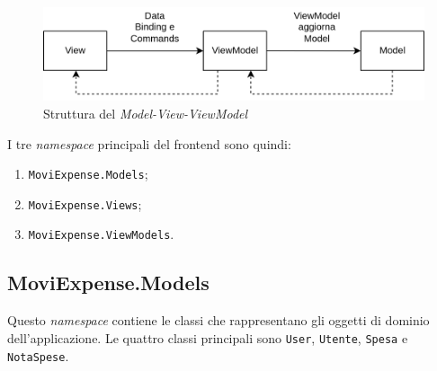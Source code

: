 \begin{figure}[H]
    \centering 
    \includegraphics[width=.9\columnwidth]{images/MVVM.png} 
    \caption{Struttura del \emph{Model-View-ViewModel}}
\end{figure}

I tre \emph{namespace} principali del frontend sono quindi:
\begin{enumerate}
    \item \verb+MoviExpense.Models+;
    \item \verb+MoviExpense.Views+;
    \item \verb+MoviExpense.ViewModels+.
\end{enumerate}

\subsection{MoviExpense.Models}

Questo \emph{namespace} contiene le classi che rappresentano gli oggetti di dominio dell'applicazione. Le quattro classi principali sono \verb+User+, \verb+Utente+, \verb+Spesa+ e \verb+NotaSpese+.

